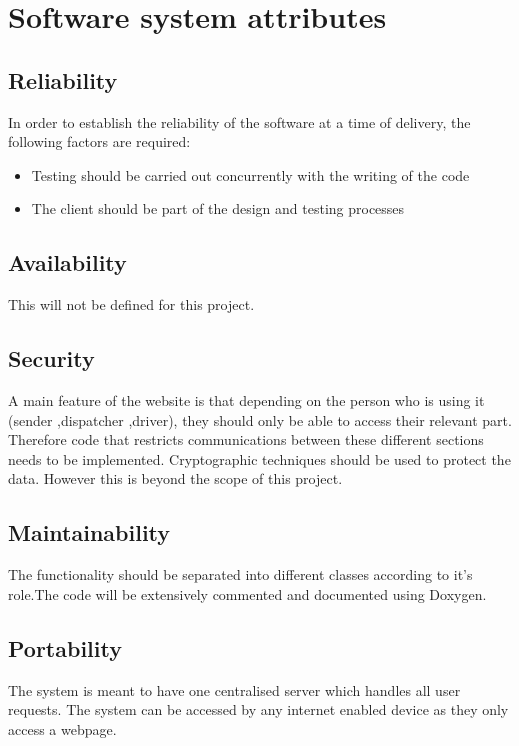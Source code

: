 \documentclass[paper=a4, fontsize=11pt]{scrartcl} %
\numberwithin{equation}{section} %
\numberwithin{figure}{section} %
\numberwithin{table}{section} %
\begin{document}
\section{Software system attributes}
\subsection{Reliability}
In order to establish the reliability of the software at a time of delivery, the following factors are required:
\begin{itemize}
			\item Testing should be carried out concurrently with the writing of the code
			\item The client should be part of the design and testing processes
			  
\end{itemize}
	

\subsection{Availability}
This will not be defined for this project.
\subsection{Security}
 A main feature of the website is that depending on the person who is using it (sender ,dispatcher ,driver), they should only be able to access their relevant part. Therefore code that restricts communications between these different sections needs to be implemented.
Cryptographic techniques should be used to protect the data. However this is beyond the scope of this project.
\subsection{Maintainability}

The functionality should be separated into different classes according to it's role.The code will be extensively commented and documented using Doxygen.

\subsection{Portability}
The system is meant to have one centralised server which handles all user requests. The system can be accessed by any internet enabled device as they only access a webpage.


\end{document}

